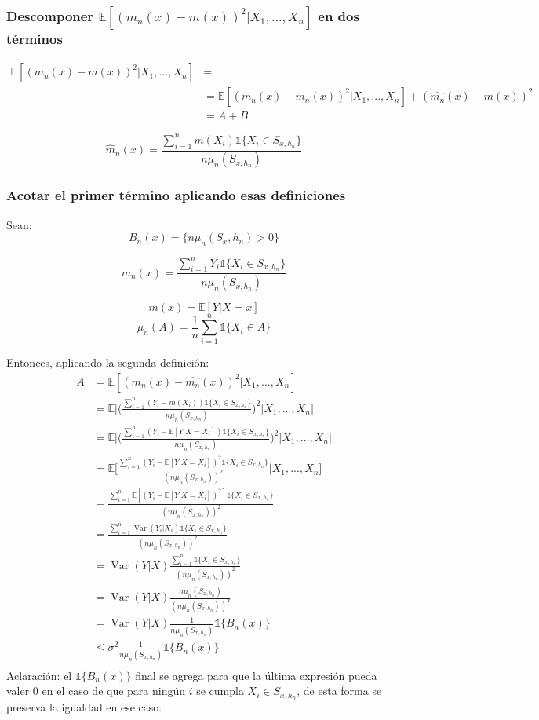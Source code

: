 \documentclass[12pt, a4paper]{article}
\begin{document}
\subsubsection{Descomponer $ \mathds{E}[ (m_n(x) - m(x))^2 | X_1, ..., X_n] $ en dos términos}

$$
\begin{aligned}
\mathds{E}[ (m_n(x) - m(x))^2 | X_1, ..., X_n ] &= \\
&= \mathds{E}[ (m_n(x) - \hat{m_n}(x))^2 | X_1, ..., X_n ] + (\hat{m_n}(x) - m(x))^2 \\ 
&= A + B
\end{aligned}
$$

$$
\hat{m}_n(x) = \frac{ \sum_{i=1}^{n} m(X_i) \mathds{1}\{ X_i \in S_{x,h_n} \} }{n \mu_n(S_{x,h_n})}
$$

\subsubsection{Acotar el primer término aplicando esas definiciones}

Sean:
$$
B_n(x)=\{ n \mu_n(S_x,h_n) > 0 \}
$$

$$
m_n(x)=\frac{ \sum_{i=1}^{n} Y_i \mathds{1}\{ X_i \in S_{x,h_n} \} }{n \mu_n(S_{x,h_n})}
$$

$$
m(x)=\mathds{E}[Y|X=x]
$$
$$
\mu_n(A)=\frac{1}{n}\sum_{i=1}^n \mathds{1}\{ X_i \in A \}
$$

Entonces, aplicando la segunda definición:
$$
\begin{aligned}
A &= \mathds{E}[ (m_n(x) - \hat{m_n}(x))^2 | X_1, ..., X_n ] \\
&= \mathds{E}\Bigg[ \Bigg( \frac{ \sum_{i=1}^{n} (Y_i - m(X_i)) \mathds{1}\{ X_i \in S_{x,h_n} \} }{n \mu_n(S_{x,h_n})} \Bigg)^2 | X_1, ..., X_n \Bigg] \\
&= \mathds{E}\Bigg[ \Bigg( \frac{ \sum_{i=1}^{n} (Y_i - \mathds{E}[Y|X=X_i]) \mathds{1}\{ X_i \in S_{x,h_n} \} }{n \mu_n(S_{x,h_n})} \Bigg)^2 | X_1, ..., X_n \Bigg] \\
&= \mathds{E}\Bigg[  \frac{ \sum_{i=1}^{n} (Y_i - \mathds{E}[Y|X=X_i])^2 \mathds{1}\{ X_i \in S_{x,h_n} \} }{(n \mu_n(S_{x,h_n}))^2}  | X_1, ..., X_n \Bigg] \\
&= \frac{ \sum_{i=1}^{n} \mathds{E}[(Y_i - \mathds{E}[Y|X=X_i])^2] \mathds{1}\{ X_i \in S_{x,h_n} \} }{(n \mu_n(S_{x,h_n}))^2} \\
&= \frac{ \sum_{i=1}^{n} \mathop{Var}(Y_i|X_i) \mathds{1}\{ X_i \in S_{x,h_n} \} }{(n \mu_n(S_{x,h_n}))^2} \\
&= \mathop{Var}(Y|X) \frac{ \sum_{i=1}^{n} \mathds{1}\{ X_i \in S_{x,h_n} \} }{(n \mu_n(S_{x,h_n}))^2} \\
&= \mathop{Var}(Y|X) \frac{n \mu_n(S_{x,h_n}) }{(n \mu_n(S_{x,h_n}))^2} \\
&= \mathop{Var}(Y|X) \frac{ 1 }{n \mu_n(S_{x,h_n})} \mathds{1} \{ B_n(x)\}\\
&\leq \sigma^2 \frac{ 1 }{n \mu_n(S_{x,h_n})} \mathds{1} \{ B_n(x)\}\\
\end{aligned}
$$
Aclaración: el $\mathds{1} \{ B_n(x)\}$ final se agrega para que la última expresión pueda valer 0 en el caso de que para ningún $i$ se cumpla $X_i \in S_{x,h_n}$, de esta forma se preserva la igualdad en ese caso.
\end{document}
